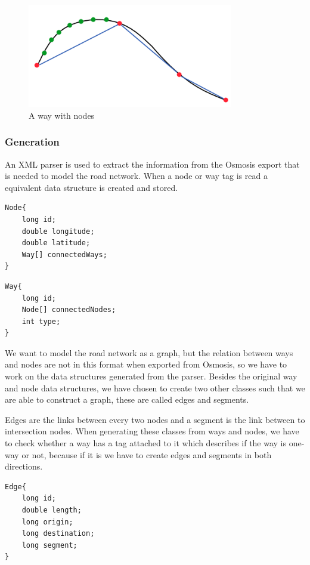 \begin{figure}[h!]
  \centering
    \includegraphics[width=0.8\textwidth]{figures/way-w-nodes.png}
    \caption{A way with nodes}
    \label{fig:waywithnodes}
\end{figure}

\subsubsection{Generation}
An XML parser is used to extract the information from the Osmosis export that is needed to model the road network. When a node or way tag is read a equivalent data structure is created and stored.

\begin{lstlisting}[style=java, caption=Datastructure for a node]
Node{
	long id;
	double longitude;
	double latitude;
	Way[] connectedWays;
}
\end{lstlisting}

\begin{lstlisting}[style=java, caption=Datastructure for a way]
Way{
	long id;
	Node[] connectedNodes;
	int type;
}
\end{lstlisting}

We want to model the road network as a graph, but the relation between ways and nodes are not in this format when exported from Osmosis, so we have to work on the data structures generated from the parser.
Besides the original way and node data structures, we have chosen to create two other classes such that we are able to construct a graph, these are called edges and segments.

Edges are the links between every two nodes and a segment is the link between to intersection nodes. When generating these classes from ways and nodes, we have to check whether a way has a tag attached to it which describes if the way is one-way or not, because if it is we have to create edges and segments in both directions.

\begin{lstlisting}[style=java, caption=Datastructure for an edge]
Edge{
	long id;
	double length;
	long origin;
	long destination;
	long segment;
}
\end{lstlisting}

